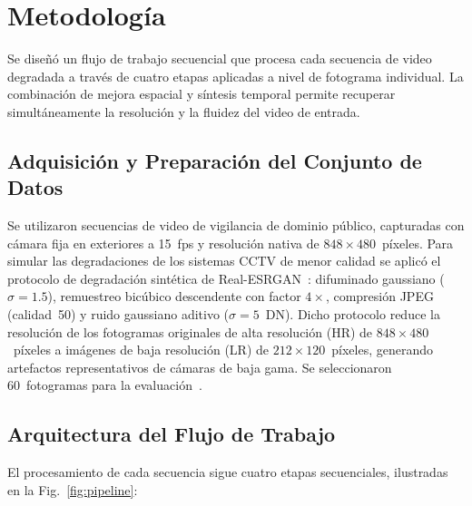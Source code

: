 \documentclass[conference]{IEEEtran}
\begin{document}
\section{Metodología}

Se diseñó un flujo de trabajo secuencial que procesa cada secuencia de video degradada a través de cuatro etapas aplicadas a nivel de fotograma individual. La combinación de mejora espacial y síntesis temporal permite recuperar simultáneamente la resolución y la fluidez del video de entrada.

\subsection{Adquisición y Preparación del Conjunto de Datos}

Se utilizaron secuencias de video de vigilancia de dominio público, capturadas con cámara fija en exteriores a 15~fps y resolución nativa de $848\times480$~píxeles. Para simular las degradaciones de los sistemas CCTV de menor calidad se aplicó el protocolo de degradación sintética de Real-ESRGAN~\cite{wang2021realesrgan}: difuminado gaussiano ($\sigma=1.5$), remuestreo bicúbico descendente con factor $4\times$, compresión JPEG (calidad~50) y ruido gaussiano aditivo ($\sigma=5$~DN). Dicho protocolo reduce la resolución de los fotogramas originales de alta resolución (HR) de $848\times480$~píxeles a imágenes de baja resolución (LR) de $212\times120$~píxeles, generando artefactos representativos de cámaras de baja gama. Se seleccionaron 60~fotogramas para la evaluación~\cite{li2011people}.

\subsection{Arquitectura del Flujo de Trabajo}

El procesamiento de cada secuencia sigue cuatro etapas secuenciales, ilustradas en la Fig.~\ref{fig:pipeline}:
\end{document}
